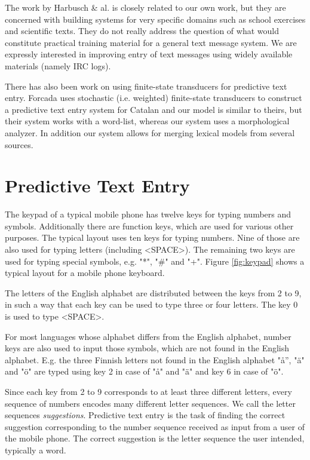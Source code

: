 \documentclass[a4paper,conference]{IEEEtran}
\begin{document}
The work by Harbusch \& al. is closely related to our own work, but they
are concerned with building systems for very specific domains such as
school exercises and scientific texts. They do not really address the
question of what would constitute practical training material for a
general text message system. We are expressly interested in improving
entry of text messages using widely available materials (namely IRC logs).

There has also been work on using finite-state transducers for
predictive text entry. Forcada \cite{Forcada01corpus-basedstochastic} uses
stochastic (i.e. weighted) finite-state transducers to construct a
predictive text entry system for Catalan and our model is similar to
theirs, but their system works with a word-list, whereas our system
uses a morphological analyzer.  In addition our system allows for
merging lexical models from several sources.
 
\section{Predictive Text Entry}
\label{sec:text-entry}

The keypad of a typical mobile phone has twelve keys for typing
numbers and symbols. Additionally there are function keys, which are
used for various other purposes. The typical layout uses ten keys for
typing numbers. Nine of those are also used for typing letters (including
<SPACE>). The remaining two keys are used for typing special symbols,
e.g. "*", "\#" and "+". Figure \ref{fig:keypad} shows a typical layout
for a mobile phone keyboard.

The letters of the English alphabet are distributed between the keys
from 2 to 9, in such a way that each key can be used to type three or
four letters. The key 0 is used to type <SPACE>.

For most languages whose alphabet differs from the English alphabet,
number keys are also used to input those symbols, which are
not found in the English alphabet. E.g. the three Finnish letters not
found in the English alphabet "å'', "\"{a}" and "\"{o}" are typed
using key 2 in case of "å" and "\"{a}" and key 6 in case of "\"{o}".

Since each key from 2 to 9 corresponds to at least three different
letters, every sequence of numbers encodes many different letter
sequences. We call the letter sequences {\it suggestions}. Predictive
text entry is the task of finding the correct suggestion corresponding
to the number sequence received as input from a user of the mobile
phone. The correct suggestion is the letter sequence the user
intended, typically a word.
\end{document}
